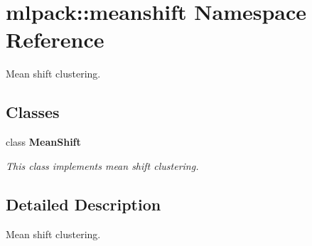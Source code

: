 \section{mlpack\+:\+:meanshift Namespace Reference}
\label{namespacemlpack_1_1meanshift}


Mean shift clustering.  


\subsection*{Classes}
\begin{DoxyCompactItemize}
\item 
class \textbf{ Mean\+Shift}
\begin{DoxyCompactList}\small\item\em This class implements mean shift clustering. \end{DoxyCompactList}\end{DoxyCompactItemize}


\subsection{Detailed Description}
Mean shift clustering. 


